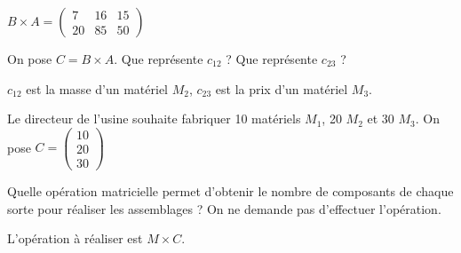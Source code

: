 \documentclass[a4paper,10pt]{article}
\begin{document}
\begin{encadre}[Réponse]
$B\times A = \begin{pmatrix}
7 & 16 & 15\\
20 & 85 & 50
\end{pmatrix}$
\end{encadre}

On pose $C=B\times A$. Que représente $c_{12}$ ? Que représente $c_{23}$ ?\\

\begin{encadre}[Réponse]
$c_{12}$ est la masse d'un matériel $M_2$, $c_{23}$ est la prix d'un matériel $M_3$.
\end{encadre}


Le directeur de l'usine souhaite fabriquer 10 matériels $M_1$, 20 $M_2$ et 30 $M_3$. On pose $C = \begin{pmatrix}
10\\20\\30
\end{pmatrix}$

Quelle opération matricielle permet d'obtenir le nombre de composants de chaque sorte pour réaliser les assemblages ? On ne demande pas d'effectuer l'opération.\\

\begin{encadre}[Réponse]
L'opération à réaliser est $M\times C$.
\end{encadre}
\end{document}
